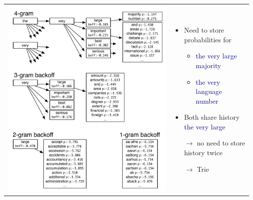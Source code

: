 \documentclass[landscape]{slides}
\newcommand{\example}[1]{\textcolor{darkblue}{\rm #1}}
\begin{document}
\vspace{-2mm}
\begin{tabular}{p{12cm}p{10cm}}
\includegraphics[scale=0.71]{lm-trie.pdf}
&
\vspace{-120mm}
\begin{itemize}
\item Need to store probabilities for
\begin{itemize}
\item \example{the very large majority}
\item \example{the very language number}
\end{itemize}
\item Both share history \example{the very large}
\item[$\rightarrow$] no need to store history twice
\item[$\rightarrow$] Trie
\end{itemize}
\end{tabular}

\end{document}
